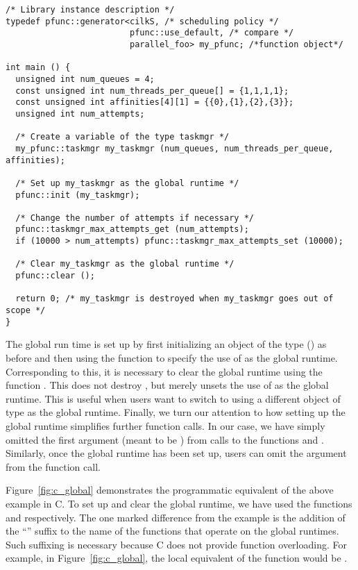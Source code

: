 \begin{lstlisting}
/* Library instance description */
typedef pfunc::generator<cilkS, /* scheduling policy */
                         pfunc::use_default, /* compare */
                         parallel_foo> my_pfunc; /*function object*/

int main () {
  unsigned int num_queues = 4;
  const unsigned int num_threads_per_queue[] = {1,1,1,1};
  const unsigned int affinities[4][1] = {{0},{1},{2},{3}};
  unsigned int num_attempts;

  /* Create a variable of the type taskmgr */
  my_pfunc::taskmgr my_taskmgr (num_queues, num_threads_per_queue, affinities);

  /* Set up my_taskmgr as the global runtime */
  pfunc::init (my_taskmgr);

  /* Change the number of attempts if necessary */
  pfunc::taskmgr_max_attempts_get (num_attempts);
  if (10000 > num_attempts) pfunc::taskmgr_max_attempts_set (10000);

  /* Clear my_taskmgr as the global runtime */
  pfunc::clear ();

  return 0; /* my_taskmgr is destroyed when my_taskmgr goes out of scope */
}
\end{lstlisting}

The global run time is set up by first initializing an object of the type
 () as before and then using the function
 to specify the use of  as the global runtime. 
Corresponding to this, it is necessary to clear the global runtime using the 
function . This does not destroy , but merely 
unsets the use of  as the global runtime. This is useful when
users want to switch to using a different object of type  as the 
global runtime. Finally, we turn our attention to how setting up the global 
runtime simplifies further function calls. In our case, we have simply omitted 
the first argument (meant to be ) from calls to the functions 
 and . Similarly, 
once the global runtime has been set up, users can omit the  
argument from the function call.

Figure~\ref{fig:c_global} demonstrates the programmatic equivalent of the above
example in C. To set up and clear the global runtime, we have used the
functions  and  respectively. The
one marked difference from the \Cpp{} example is the addition of the
``'' suffix to the name of the functions that operate on the global
runtimes. Such suffixing is necessary because C does not provide function
overloading. For example, in Figure~\ref{fig:c_global}, the local equivalent of
the function  would be
.

